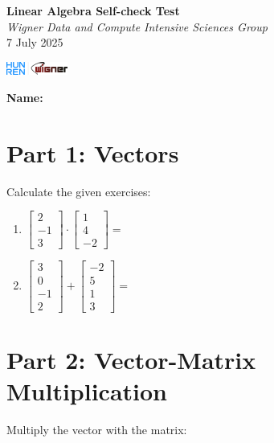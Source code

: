 \documentclass{article}
\begin{document}
\begin{minipage}{0.8\textwidth}
	\centering
	{\Large\textbf{Linear Algebra Self-check Test}\\ \textit{Wigner Data and Compute Intensive Sciences Group}}\\
	\vspace*{0.25cm}
	{\normalsize 7 July 2025}
\end{minipage}
\begin{minipage}{0.2\textwidth}
	\includegraphics[width=2cm]{../img/logo.png}
\end{minipage}


\vspace{0.75cm}

\textbf{Name:} \underline{\hspace{5cm}}

\section*{Part 1: Vectors}
Calculate the given exercises:

\begin{enumerate}
\item $\begin{bmatrix} 2 \\ -1 \\ 3 \end{bmatrix} \cdot \begin{bmatrix} 1 \\ 4 \\ -2 \end{bmatrix} = $ \underline{\hspace{3cm}}

\item $\begin{bmatrix} 3 \\ 0 \\ -1 \\ 2 \end{bmatrix} + \begin{bmatrix} -2 \\ 5 \\ 1 \\ 3 \end{bmatrix} = $ \underline{\hspace{3cm}}
\end{enumerate}

\section*{Part 2: Vector-Matrix Multiplication}
Multiply the vector with the matrix:
\end{document}
